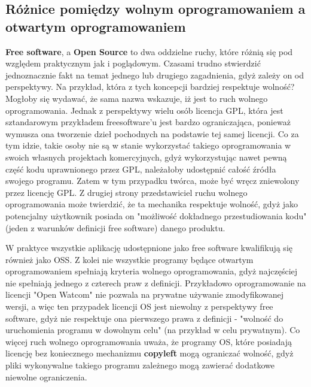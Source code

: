 \documentclass{article}
\begin{document}
\subsection{Różnice pomiędzy wolnym oprogramowaniem a otwartym oprogramowaniem}

\hspace{4mm} \textbf{Free software}, a \textbf{Open Source} to dwa oddzielne ruchy, które różnią się pod względem praktycznym jak i poglądowym.
Czasami trudno stwierdzić jednoznacznie fakt na temat jednego lub drugiego zagadnienia, gdyż zależy on od perspektywy. Na przykład, która z tych koncepcji bardziej respektuje wolność? Mogłoby się wydawać, że sama nazwa wskazuje, iż jest to ruch wolnego oprogramowania. Jednak z perspektywy wielu osób licencja GPL, która jest sztandarowym przykładem freesoftware'u jest bardzo ograniczająca, ponieważ wymusza ona tworzenie dzieł pochodnych na podstawie tej samej licencji. Co za tym idzie, takie osoby nie są w stanie wykorzystać takiego oprogramowania w swoich własnych projektach komercyjnych, gdyż wykorzystując nawet pewną część kodu uprawnionego przez GPL, należałoby udostępnić całość źródła swojego programu. Zatem w tym przypadku twórca, może być wręcz zniewolony przez licencję GPL. Z drugiej strony przedstawiciel ruchu wolnego oprogramowania może twierdzić, że ta mechanika respektuje wolność, gdyż jako potencjalny użytkownik posiada on "możliwość dokładnego przestudiowania kodu" (jeden z warunków definicji free software) danego produktu.

W praktyce wszystkie aplikację udostępnione jako free software kwalifikują się również jako OSS. Z kolei nie wszystkie programy będące otwartym oprogramowaniem spełniają kryteria wolnego oprogramowania, gdyż najczęściej nie spełniają jednego z czterech praw z definicji. Przykładowo oprogramowanie na licencji "Open Watcom" nie pozwala na prywatne używanie zmodyfikowanej wersji, a więc ten przypadek licencji OS jest niewolny z perspektywy free software, gdyż nie respektuje ona pierwszego prawa z definicji - "wolność do uruchomienia programu w dowolnym celu" (na przykład w celu prywatnym). Co więcej ruch wolnego oprogramowania uważa, że programy OS, które posiadają licencję bez koniecznego mechanizmu \textbf{copyleft} mogą ograniczać wolność, gdyż pliki wykonywalne takiego programu zależnego mogą zawierać dodatkowe niewolne ograniczenia\cite{gnu.difference}.
\end{document}
